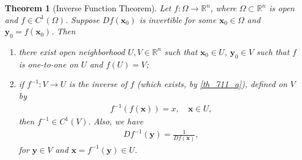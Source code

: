 \documentclass[10pt]{book}
\newtheorem{theorem}{Theorem}[chapter]
\theoremstyle{definition}
\numberwithin{equation}{chapter}
\begin{document}
\begin{theorem}[Inverse Function Theorem]\label{th_711}
Let $f: \Omega \to \mathbb{R}^n$, where $\Omega \subset \mathbb{R}^n$ is open and $f \in C^1(\Omega)$. Suppose $Df(\mathbf{x}_0)$ is invertible for some $\mathbf{x}_0 \in \Omega$ and $\mathbf{y}_0 = f(\mathbf{x}_0)$. Then
\begin{enumerate}[label=(\alph*)]
    \item there exist open neighborhood $U, V \in \mathbb{R}^n$ such that $\mathbf{x}_0 \in U$, $\mathbf{y}_0 \in V$ such that $f$ is one-to-one on $U$ and $f(U) = V$; \label{th_711_a}
    
    \item if $f^{-1}: V \to U$ is the inverse of $f$ (which exists, by \ref{th_711_a}), defined on $V$ by
    \begin{align*}
        f^{-1}(f(\mathbf{x})) = x, \quad \mathbf{x} \in U,
    \end{align*}
    then $f^{-1} \in C^1(V)$. Also, we have
    \begin{align*}
        Df^{-1}(\mathbf{y}) = \frac{1}{Df(\mathbf{x})},
    \end{align*}
    for $\mathbf{y} \in V$ and $\mathbf{x} = f^{-1}(\mathbf{y}) \in U$. \label{th_711_b}
\end{enumerate}
\end{theorem}
\end{document}
